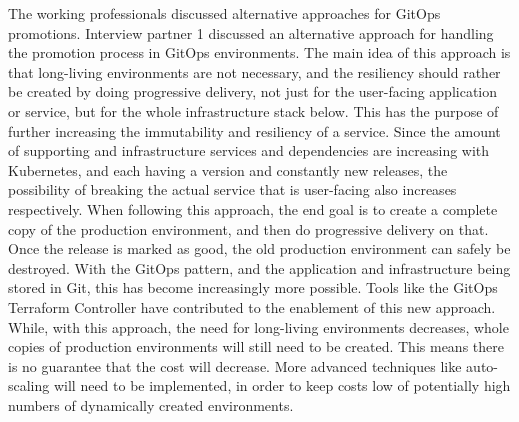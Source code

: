 The working professionals discussed alternative approaches for GitOps promotions.
Interview partner 1 discussed an alternative approach for handling the promotion process in GitOps environments.
The main idea of this approach is that long-living environments are not necessary,
and the resiliency should rather be created by doing progressive delivery,
not just for the user-facing application or service,
but for the whole infrastructure stack below.
This has the purpose of further increasing the immutability and resiliency of a service.
Since the amount of supporting and infrastructure services and dependencies are increasing with Kubernetes,
and each having a version and constantly new releases, the possibility of breaking the actual service that is user-facing also increases respectively.
%
When following this approach, the end goal is to create a complete copy of the production environment,
and then do progressive delivery on that.
Once the release is marked as good, the old production environment can safely be destroyed.
With the GitOps pattern, and the application and infrastructure being stored in Git,
this has become increasingly more possible.
Tools like the GitOps Terraform Controller have contributed to the enablement of this new approach. 
While, with this approach, the need for long-living environments decreases,
whole copies of production environments will still need to be created.
This means there is no guarantee that the cost will decrease.
More advanced techniques like auto-scaling will need to be implemented, in order to
keep costs low of potentially high numbers of dynamically created environments.


















